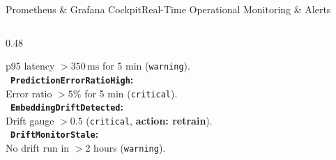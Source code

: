 \documentclass[aspectratio=169,10pt]{beamer}
\begin{document}
\begin{frame}{Prometheus \& Grafana Cockpit}{Real-Time Operational Monitoring \& Alerts}
\begin{columns}[T]
\begin{column}{0.48\textwidth}
\begin{rosecard}
                \quad p95 latency $> 350\,\text{ms}$ for 5 min (\texttt{warning}).\\[2pt]
                \textbullet\ \textbf{\texttt{PredictionErrorRatioHigh}:}\\
                \quad Error ratio $> 5\%$ for 5 min (\texttt{critical}).\\[2pt]
                \textbullet\ \textbf{\texttt{EmbeddingDriftDetected}:}\\
                \quad Drift gauge $> 0.5$ (\texttt{critical}, \textbf{action: retrain}).\\[2pt]
                \textbullet\ \textbf{\texttt{DriftMonitorStale}:}\\
                \quad No drift run in $> 2$ hours (\texttt{warning}).
            \end{rosecard}
        \end{column}
    \end{columns}
\end{frame}
\end{document}

